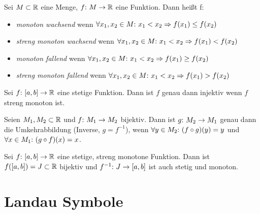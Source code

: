 \begin{frameddefn}
	Sei $M \subset \mathbb{R}$ eine Menge, $f{:}\  M \to \mathbb{R}$ eine Funktion. Dann heißt f:
	\begin{itemize}
		\item \textit{monoton wachsend} wenn $\forall x_1, x_2 \in M{:}\  x_1 < x_2 \Rightarrow f(x_1) \leq f(x_2)$
		\item \textit{streng monoton wachsend} wenn $\forall x_1, x_2 \in M{:}\  x_1 < x_2 \Rightarrow f(x_1) < f(x_2)$
		\item \textit{monoton fallend} wenn $\forall x_1, x_2 \in M{:}\  x_1 < x_2 \Rightarrow f(x_1) \geq f(x_2)$
		\item \textit{streng monoton fallend} wenn $\forall x_1, x_2 \in M{:}\  x_1 < x_2 \Rightarrow f(x_1) > f(x_2)$
	\end{itemize}
\end{frameddefn}

\begin{framedthm}
	Sei $f{:}\  [a,b] \to \mathbb{R}$ eine stetige Funktion. Dann ist $f$ genau dann injektiv wenn $f$ streng monoton ist.
\end{framedthm}

\begin{frameddefn}[Umkehrabbildung]
	Seien $M_1, M_2 \subset \mathbb{R}$ und $f{:}\  M_1 \to M_2$ bijektiv. Dann ist $g{:}\  M_2 \to M_1$ genau dann die Umkehrabbildung (Inverse, $g=f^{-1}$), wenn $\forall y \in M_2{:}\  (f \circ g)(y) = y$ und\\ $\forall x \in M_1{:}\  (g \circ f)(x) = x$.
\end{frameddefn}

\begin{framedthm}
	Sei $f{:}\  [a,b] \to \mathbb{R}$ eine stetige, streng monotone Funktion. Dann ist $f([a,b]) = J \subset \mathbb{R}$ bijektiv und $f^{-1}{:}\  J \to [a,b]$ ist auch stetig und monoton.
\end{framedthm}

\section{Landau Symbole}

